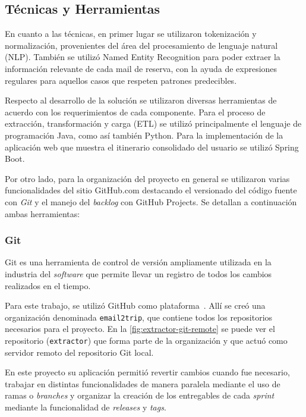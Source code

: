 \subsection{Técnicas y Herramientas}%
\label{subsec:tools}

En cuanto a las técnicas, en primer lugar se utilizaron tokenización y normalización, provenientes del área del
procesamiento de lenguaje natural (NLP).
También se utilizó Named Entity Recognition para poder extraer la información relevante de cada mail de reserva, con
la ayuda de expresiones regulares para aquellos casos que respeten patrones predecibles.

Respecto al desarrollo de la solución se utilizaron diversas herramientas de acuerdo con los requerimientos de cada
componente.
Para el proceso de extracción, transformación y carga (ETL) se utilizó principalmente el lenguaje de programación
Java, como así también Python.
Para la implementación de la aplicación web que muestra el itinerario consolidado del usuario se utilizó Spring Boot.

Por otro lado, para la organización del proyecto en general se utilizaron varias funcionalidades del sitio GitHub.com
destacando el versionado del código fuente con \textit{Git} y el manejo del \textit{backlog} con GitHub Projects.
Se detallan a continuación ambas herramientas:

\subsubsection{Git}

Git es una herramienta de control de versión ampliamente utilizada en la industria del \textit{software} que permite
llevar un registro de todos los cambios realizados en el tiempo.

Para este trabajo, se utilizó GitHub como plataforma~\cite{github}.
Allí se creó una organización denominada \texttt{email2trip}, que contiene todos los repositorios necesarios para el
proyecto.
En la \autoref{fig:extractor-git-remote} se puede ver el repositorio (\texttt{extractor}) que forma parte de
la organización y que actuó como servidor remoto del repositorio Git local.

En este proyecto su aplicación permitió revertir cambios cuando fue necesario, trabajar en distintas funcionalidades de
manera paralela mediante el uso de ramas o \textit{branches} y organizar la creación de los entregables de cada
\textit{sprint} mediante la funcionalidad de \textit{releases} y \textit{tags}.

